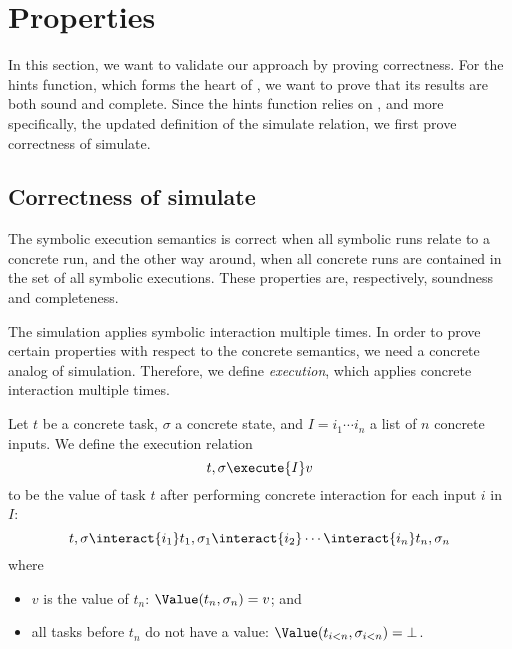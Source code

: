 
\section{Properties}
\label{sec:properties}

In this section, we want to validate our approach by proving correctness.
For the hints function, which forms the heart of \ASTOPHAT, we want to prove that its results are both sound and complete.
Since the hints function relies on \STOPHAT,
and more specifically, the updated definition of the simulate relation,
we first prove correctness of simulate.

\subsection{Correctness of simulate}

The symbolic execution semantics is correct when all symbolic runs relate to a concrete run,
and the other way around, when all concrete runs are contained in the set of all symbolic executions.
These properties are, respectively, soundness and completeness.

The simulation applies symbolic interaction multiple times.
In order to prove certain properties with respect to the concrete semantics,
we need a concrete analog of simulation.
Therefore, we define \emph{execution}, which applies concrete interaction multiple times.

\begin{definition}
  \label{def:execution}
  Let $t$ be a concrete task, $\sigma$ a concrete state, and $I = i_1 \cdots i_n$ a list of $n$ concrete inputs.
  We define the execution relation
  \begin{equation*}
    t, \sigma \execute{I} v
  \end{equation*}
  to be the value of task $t$ after performing concrete interaction for each input $i$ in $I$:
  \begin{equation*}
    t, \sigma
      \interact{i_1} t_1, \sigma_1
      \interact{i_2} \cdots
      \interact{i_n} t_n, \sigma_n
  \end{equation*}
  where
  \begin{itemize}
    \item $v$ is the value of $t_n$: $\Value(t_n, \sigma_n) = v$; and
    \item all tasks before $t_n$ do not have a value: $\Value(t_{i<n},\sigma_{i<n}) = \bot$.
  \end{itemize}
\end{definition}

